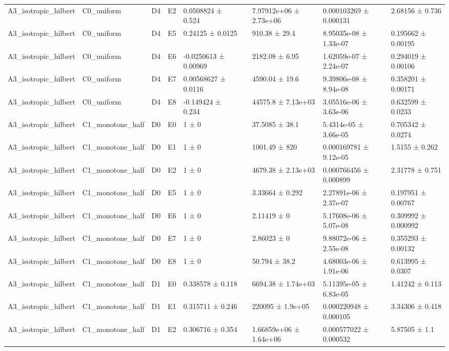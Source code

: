 \begin{table}
\begin{tabular}{lllllllll}
A3\_isotropic\_hilbert & C0\_uniform & D4 & E2 & 0.0508824 ± 0.524 &  & 7.97912e+06 ± 2.73e+06 & 0.000103269 ± 0.000131 & 2.68156 ± 0.736 \\
A3\_isotropic\_hilbert & C0\_uniform & D4 & E5 & 0.24125 ± 0.0125 &  & 910.38 ± 29.4 & 8.95035e-08 ± 1.33e-07 & 0.195662 ± 0.00195 \\
A3\_isotropic\_hilbert & C0\_uniform & D4 & E6 & -0.0250613 ± 0.00969 &  & 2182.08 ± 6.95 & 1.62059e-07 ± 2.24e-07 & 0.294019 ± 0.00106 \\
A3\_isotropic\_hilbert & C0\_uniform & D4 & E7 & 0.00568627 ± 0.0116 &  & 4590.04 ± 19.6 & 9.39806e-08 ± 8.94e-08 & 0.358201 ± 0.00171 \\
A3\_isotropic\_hilbert & C0\_uniform & D4 & E8 & -0.149424 ± 0.234 &  & 44575.8 ± 7.13e+03 & 3.05516e-06 ± 3.63e-06 & 0.632599 ± 0.0233 \\
A3\_isotropic\_hilbert & C1\_monotone\_half & D0 & E0 & 1 ± 0 &  & 37.5085 ± 38.1 & 5.4314e-05 ± 3.66e-05 & 0.705342 ± 0.0274 \\
A3\_isotropic\_hilbert & C1\_monotone\_half & D0 & E1 & 1 ± 0 &  & 1001.49 ± 820 & 0.000169781 ± 9.12e-05 & 1.5155 ± 0.262 \\
A3\_isotropic\_hilbert & C1\_monotone\_half & D0 & E2 & 1 ± 0 &  & 4679.38 ± 2.13e+03 & 0.000766456 ± 0.000899 & 2.31778 ± 0.751 \\
A3\_isotropic\_hilbert & C1\_monotone\_half & D0 & E5 & 1 ± 0 &  & 3.33664 ± 0.292 & 2.27891e-06 ± 2.37e-07 & 0.197951 ± 0.00767 \\
A3\_isotropic\_hilbert & C1\_monotone\_half & D0 & E6 & 1 ± 0 &  & 2.11419 ± 0 & 5.17608e-06 ± 5.07e-08 & 0.309992 ± 0.000992 \\
A3\_isotropic\_hilbert & C1\_monotone\_half & D0 & E7 & 1 ± 0 &  & 2.86023 ± 0 & 9.88072e-06 ± 2.55e-08 & 0.355293 ± 0.00132 \\
A3\_isotropic\_hilbert & C1\_monotone\_half & D0 & E8 & 1 ± 0 &  & 50.794 ± 38.2 & 4.68003e-06 ± 1.91e-06 & 0.613995 ± 0.0307 \\
A3\_isotropic\_hilbert & C1\_monotone\_half & D1 & E0 & 0.338578 ± 0.118 &  & 6694.38 ± 1.74e+03 & 5.11395e-05 ± 6.83e-05 & 1.41242 ± 0.113 \\
A3\_isotropic\_hilbert & C1\_monotone\_half & D1 & E1 & 0.315711 ± 0.246 &  & 220095 ± 1.9e+05 & 0.000220948 ± 0.000105 & 3.34306 ± 0.418 \\
A3\_isotropic\_hilbert & C1\_monotone\_half & D1 & E2 & 0.306716 ± 0.354 &  & 1.66859e+06 ± 1.64e+06 & 0.000577022 ± 0.000532 & 5.87505 ± 1.1 \\

\end{tabular}
\end{table}
